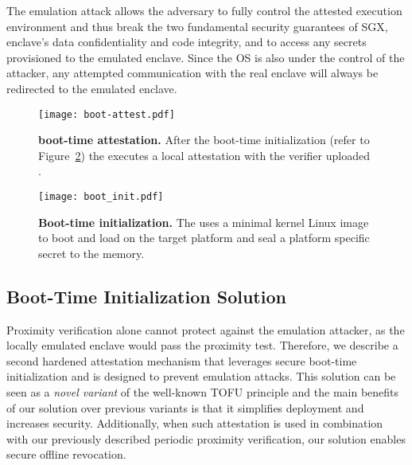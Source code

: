  The emulation attack allows the adversary to fully control the attested execution environment and thus break the two fundamental security guarantees of SGX, enclave's data confidentiality and code integrity, and to access any secrets provisioned to the emulated enclave. Since the OS is also under the control of the attacker, any attempted communication with the real enclave will always be redirected to the emulated enclave.




\begin{figure}[t]
 \centering
\texttt{[image: boot-attest.pdf]}
 \caption{\textbf{\name boot-time attestation.} After the boot-time initialization (refer to Figure~\ref{fig:boot-init}) the \nameclave executes a local attestation with the verifier uploaded \app. 
 }
\figsaver
 \label{fig:boot-attest}
\end{figure}


\begin{figure}[t]
 \centering
    \texttt{[image: boot\_init.pdf]}
 \caption{\textbf{Boot-time initialization.} The \device uses a minimal kernel Linux image to boot and load \nameclave on the target platform and seal a platform specific secret to the \device memory.}
\figsaver
 \label{fig:boot-init}
\end{figure}



\subsection{Boot-Time Initialization Solution}

Proximity verification alone cannot protect against the emulation attacker, as the locally emulated enclave would pass the proximity test. 
%
Therefore, we describe a second hardened attestation mechanism that leverages secure boot-time initialization and is designed to prevent emulation attacks. This solution can be seen as a \emph{novel variant} of the well-known TOFU principle and the main benefits of our solution over previous variants is that it simplifies deployment and increases security. Additionally, when such attestation is used in combination with our previously described periodic proximity verification, our solution enables secure offline revocation.


